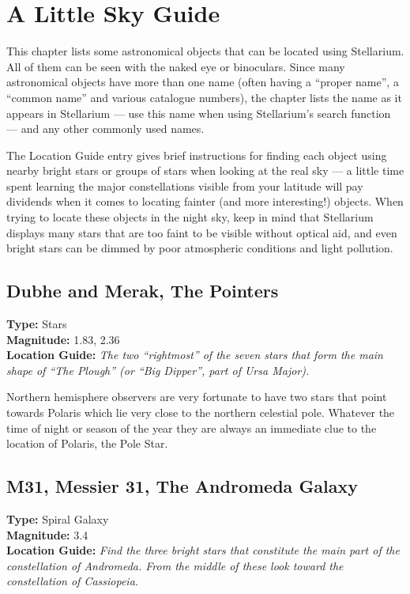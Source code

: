 
\chapter{A Little Sky Guide}
\label{ch:SkyGuide}

This chapter lists some astronomical objects that can be located using
Stellarium. All of them can be seen with the naked eye or binoculars.
Since many astronomical objects have more than one name (often having a
``proper name'', a ``common name'' and various catalogue numbers), the chapter lists the name as it appears in Stellarium --- use this name when using Stellarium's search function --- and any other commonly used names.

The Location Guide entry gives brief instructions for finding each
object using nearby bright stars or groups of stars when looking at the
real sky --- a little time spent learning the major constellations
visible from your latitude will pay dividends when it comes to locating
fainter (and more interesting!) objects. When trying to locate these
objects in the night sky, keep in mind that Stellarium displays many
stars that are too faint to be visible without optical aid, and even
bright stars can be dimmed by poor atmospheric conditions and light
pollution.

\section{Dubhe and Merak, The Pointers}
\textbf{Type:} Stars \\
\textbf{Magnitude:} 1.83, 2.36 \\
\textbf{Location Guide:} \textit{The two ``rightmost'' of the seven stars that form the main shape of ``The Plough'' (or ``Big Dipper'', part of Ursa Major).} 

Northern hemisphere observers are very fortunate to have two stars
that point towards Polaris which lie very close to the northern
celestial pole. Whatever the time of night or season of the year they
are always an immediate clue to the location of Polaris, the Pole
Star.

\section{M31, Messier 31, The Andromeda Galaxy}
\textbf{Type:} Spiral Galaxy \\
\textbf{Magnitude:} 3.4 \\ 
\textbf{Location Guide:} \textit{Find the three bright stars that constitute the main part of the constellation of Andromeda. From the middle of these look toward the constellation of Cassiopeia.}

